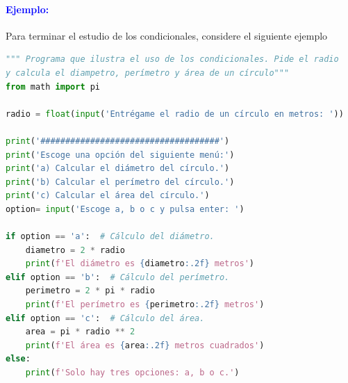 \documentclass[12pt]{article}
\begin{document}
\paragraph{\textcolor{blue}{Ejemplo:}}Para terminar el estudio de los condicionales, 
considere el siguiente ejemplo
%
\begin{lstlisting}[language=Python, captionpos=t, title=\texttt{menu.py}]
""" Programa que ilustra el uso de los condicionales. Pide el radio
y calcula el diampetro, perímetro y área de un círculo"""    
from math import pi

radio = float(input('Entrégame el radio de un círculo en metros: '))

print('####################################')
print('Escoge una opción del siguiente menú:')
print('a) Calcular el diámetro del círculo.')
print('b) Calcular el perímetro del círculo.')
print('c) Calcular el área del círculo.')
option= input('Escoge a, b o c y pulsa enter: ')

if option == 'a':  # Cálculo del diámetro.
    diametro = 2 * radio
    print(f'El diámetro es {diametro:.2f} metros')
elif option == 'b':  # Cálculo del perímetro.
    perimetro = 2 * pi * radio
    print(f'El perímetro es {perimetro:.2f} metros')
elif option == 'c':  # Cálculo del área.
    area = pi * radio ** 2
    print(f'El área es {area:.2f} metros cuadrados')
else:
    print(f'Solo hay tres opciones: a, b o c.')
\end{lstlisting}
%
\end{document}
